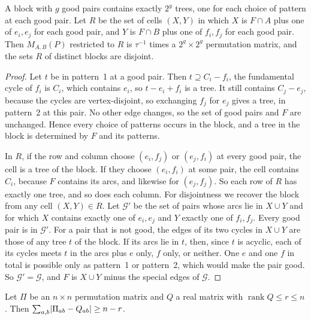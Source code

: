 \begin{lemma}[blocks]\label{lem:signed-blocks}
A block with $g$ good pairs contains exactly $2^g$ trees, one for each choice of pattern at each good pair. Let $R$ be the set of cells $(X,Y)$ in which $X$ is $F\cap A$ plus one of $e_i,e_j$ for each good pair, and $Y$ is $F\cap B$ plus one of $f_i,f_j$ for each good pair. Then $M_{A,B}(P)$ restricted to $R$ is $\tau^{-1}$ times a $2^g\times2^g$ permutation matrix, and the sets $R$ of distinct blocks are disjoint.
\end{lemma}

\begin{proof}
Let $t$ be in pattern~1 at a good pair. Then $t\supseteq C_i-f_i$, the fundamental cycle of $f_i$ is $C_i$, which contains $e_i$, so $t-e_i+f_i$ is a tree. It still contains $C_j-e_j$, because the cycles are vertex-disjoint, so exchanging $f_j$ for $e_j$ gives a tree, in pattern~2 at this pair. No other edge changes, so the set of good pairs and $F$ are unchanged. Hence every choice of patterns occurs in the block, and a tree in the block is determined by $F$ and its patterns.

In $R$, if the row and column choose $(e_i,f_j)$ or $(e_j,f_i)$ at every good pair, the cell is a tree of the block. If they choose $(e_i,f_i)$ at some pair, the cell contains $C_i$, because $F$ contains its arcs, and likewise for $(e_j,f_j)$. So each row of $R$ has exactly one tree, and so does each column. For disjointness we recover the block from any cell $(X,Y)\in R$. Let $\mathcal G'$ be the set of pairs whose arcs lie in $X\cup Y$ and for which $X$ contains exactly one of $e_i,e_j$ and $Y$ exactly one of $f_i,f_j$. Every good pair is in $\mathcal G'$. For a pair that is not good, the edges of its two cycles in $X\cup Y$ are those of any tree $t$ of the block. If its arcs lie in $t$, then, since $t$ is acyclic, each of its cycles meets $t$ in the arcs plus $e$ only, $f$ only, or neither. One $e$ and one $f$ in total is possible only as pattern~1 or pattern~2, which would make the pair good. So $\mathcal G'=\mathcal G$, and $F$ is $X\cup Y$ minus the special edges of $\mathcal G$.
\end{proof}

\begin{lemma}\label{lem:l1-rank}
Let $\Pi$ be an $n\times n$ permutation matrix and $Q$ a real matrix with $\operatorname{rank}Q\le r\le n$. Then $\sum_{a,b}\lvert \Pi_{ab}-Q_{ab}\rvert\ge n-r$.
\end{lemma}

